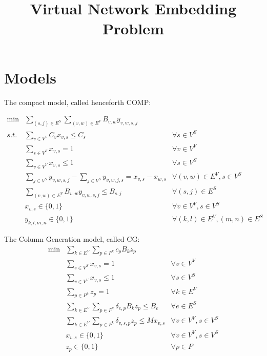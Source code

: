 \documentclass{article}
\title{Virtual Network Embedding Problem}
\begin{document}
\pagestyle{headings}


\section{Models}

The compact model, called henceforth COMP:

\begin{align}
    \min & \sum\limits_{(s,j) \in E^{S}} \sum\limits_{(v,w) \in E^{V}} B_{v,w} y_{v,w,s,j} \nonumber \\
    s.t. & \sum\limits_{v \in V^{V}} C_{v} x_{v,s} \leq C_{s}                     & \forall s \in V^{S}  \label{eq:flowcap} \\
    & \sum\limits_{s \in V^{S}} x_{v,s} = 1                                  & \forall v \in V^{V}  \label{eq:flowvirone}\\
         & \sum\limits_{v \in V^{V}} x_{v,s} \leq 1                               & \forall s \in V^{S} \label{eq:flowsubone}\\
         & \sum\limits_{j \in V^{S}} y_{v,w,s,j} - \sum\limits_{j \in V^{S}} y_{v,w,j,s} = x_{v,s} - x_{w,s}  & \forall (v,w) \in E^{V}, s \in V^{S}\label{eq:flowflow} \\
         & \sum\limits_{(v,w) \in E^{V}} B_{v,w} y_{v,w,s,j} \leq B_{s,j}  & \forall (s,j) \in E^{S} \label{eq:flowbandwidth} \\
         & x_{v,s} \in \{0,1\} & \forall v \in V^{V}, s \in V^{S} \\
         & y_{k,l,m,n} \in \{0,1\} & \forall (k,l) \in E^{V}, (m,n) \in E^{S}
\end{align} 

The Column Generation model, called CG:
\begin{align}
  \min  & \sum\limits_{k \in E^{V}}\sum\limits_{p \in P^k}  c_{p} B_k z_{p} \label{eq:obj} \\
        & \sum\limits_{s \in V^{S}} x_{v,s} = 1                                  & \forall v \in V^{V} \label{eq:virone} \\
        & \sum\limits_{v \in V^{V}} x_{v,s} \leq 1                               & \forall s \in V^{S} \label{eq:subone} \\
        & \sum\limits_{p \in P^{k}} z_{p} = 1                                    & \forall k \in E^{V} \label{eq:virdemone} \\
        & \sum\limits_{k \in E^{V}}\sum\limits_{p \in P^{k}} \delta_{e,p} B_{k} z_{p} \leq B_{e} & \forall e \in E^{S} \label{eq:bandwidth} \\
        &  \sum\limits_{k \in E^{V}}\sum\limits_{p \in P^k} \delta_{v,s,p} z_{p} \leq M x_{v,s} & \forall v \in V^{V}, s \in V^{S} \label{eq:onlyoneaux}\\
        &  x_{v,s} \in \{0,1\}  & \forall v \in V^{V}, s \in V^{S} \nonumber \\
        & z_{p} \in \{0,1\}    & \forall p \in {P} \nonumber
\end{align}
\end{document}
